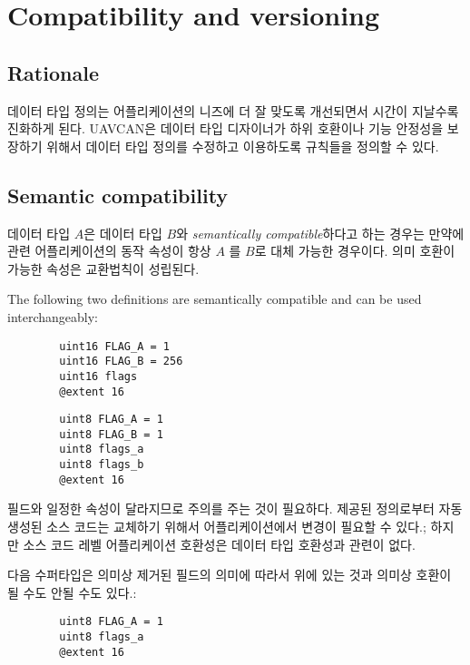 \section{Compatibility and versioning}\label{sec:dsdl_versioning}

\subsection{Rationale}

데이터 타입 정의는 어플리케이션의 니즈에 더 잘 맞도록 개선되면서 시간이 지날수록 진화하게 된다.
UAVCAN은 데이터 타입 디자이너가 하위 호환이나 기능 안정성을 보장하기 위해서 데이터 타입 정의를 수정하고 이용하도록 규칙들을 정의할 수 있다.

\subsection{Semantic compatibility}\label{sec:dsdl_semantic_compatibility}

데이터 타입 $A$은 데이터 타입 $B$와 \emph{semantically compatible}하다고 하는 경우는 만약에 관련 어플리케이션의 동작 속성이 항상 $A$ 를 $B$로 대체 가능한 경우이다.
의미 호환이 가능한 속성은 교환법칙이 성립된다.

\begin{remark}[breakable]
    The following two definitions are semantically compatible and can be used interchangeably:

    \begin{verbatim}
        uint16 FLAG_A = 1
        uint16 FLAG_B = 256
        uint16 flags
        @extent 16
    \end{verbatim}

    \begin{verbatim}
        uint8 FLAG_A = 1
        uint8 FLAG_B = 1
        uint8 flags_a
        uint8 flags_b
        @extent 16
    \end{verbatim}

    필드와 일정한 속성이 달라지므로 주의를 주는 것이 필요하다.
    제공된 정의로부터 자동생성된 소스 코드는 교체하기 위해서 어플리케이션에서 변경이 필요할 수 있다.;
    하지만 소스 코드 레벨 어플리케이션 호환성은 데이터 타입 호환성과 관련이 없다.


    다음 수퍼타입은 의미상 제거된 필드의 의미에 따라서 위에 있는 것과 의미상 호환이 될 수도 안될 수도 있다.:

    \begin{verbatim}
        uint8 FLAG_A = 1
        uint8 flags_a
        @extent 16
    \end{verbatim}
\end{remark}

